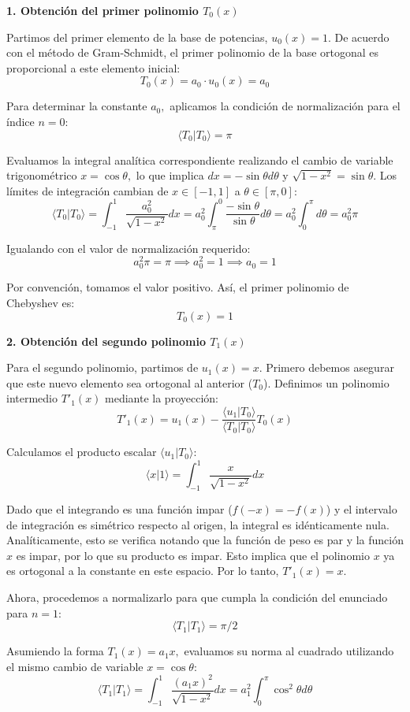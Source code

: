 \documentclass[a4paper]{article}
\begin{document}
\textbf{1. Obtención del primer polinomio $T_0(x)$}

Partimos del primer elemento de la base de potencias, $u_0(x) = 1.$ De acuerdo con el método de Gram-Schmidt, el primer polinomio de la base ortogonal es proporcional a este elemento inicial:
$$ T_0(x) = a_0 \cdot u_0(x) = a_0 $$

Para determinar la constante $a_0,$ aplicamos la condición de normalización para el índice $n=0$:
$$ \langle T_0 | T_0 \rangle = \pi $$

Evaluamos la integral analítica correspondiente realizando el cambio de variable trigonométrico $x = \cos \theta,$ lo que implica $dx = -\sin \theta d\theta$ y $\sqrt{1-x^2} = \sin \theta.$ Los límites de integración cambian de $x \in [-1, 1]$ a $\theta \in [\pi, 0]:$
$$ \langle T_0 | T_0 \rangle = \int_{-1}^{1} \frac{a_0^2}{\sqrt{1-x^2}} dx = a_0^2 \int_{\pi}^{0} \frac{-\sin \theta}{\sin \theta} d\theta = a_0^2 \int_{0}^{\pi} d\theta = a_0^2 \pi $$

Igualando con el valor de normalización requerido:
$$ a_0^2 \pi = \pi \implies a_0^2 = 1 \implies a_0 = 1 $$

Por convención, tomamos el valor positivo. Así, el primer polinomio de Chebyshev es:
$$ T_0(x) = 1 $$

\textbf{2. Obtención del segundo polinomio $T_1(x)$}

Para el segundo polinomio, partimos de $u_1(x) = x.$ Primero debemos asegurar que este nuevo elemento sea ortogonal al anterior ($T_0$). Definimos un polinomio intermedio $T'_1(x)$ mediante la proyección:
$$ T'_1(x) = u_1(x) - \frac{\langle u_1 | T_0 \rangle}{\langle T_0 | T_0 \rangle} T_0(x) $$

Calculamos el producto escalar $\langle u_1 | T_0 \rangle$:
$$ \langle x | 1 \rangle = \int_{-1}^{1} \frac{x}{\sqrt{1-x^2}} dx $$

Dado que el integrando es una función impar ($f(-x) = -f(x)$) y el intervalo de integración es simétrico respecto al origen, la integral es idénticamente nula. Analíticamente, esto se verifica notando que la función de peso es par y la función $x$ es impar, por lo que su producto es impar. Esto implica que el polinomio $x$ ya es ortogonal a la constante en este espacio. Por lo tanto, $T'_1(x) = x.$

Ahora, procedemos a normalizarlo para que cumpla la condición del enunciado para $n=1$:
$$ \langle T_1 | T_1 \rangle = \pi/2 $$

Asumiendo la forma $T_1(x) = a_1 x,$ evaluamos su norma al cuadrado utilizando el mismo cambio de variable $x = \cos \theta$:
$$ \langle T_1 | T_1 \rangle = \int_{-1}^{1} \frac{(a_1 x)^2}{\sqrt{1-x^2}} dx = a_1^2 \int_{0}^{\pi} \cos^2 \theta d\theta $$
\end{document}
